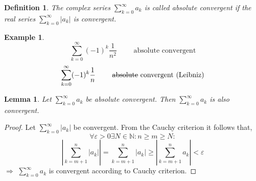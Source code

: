 \documentclass[a4paper,landscape,twocolumn]{article}
\newtheorem{defi}{Definition}
\newtheorem{ex}{Example}
\newtheorem{lemma}{Lemma}
\newcommand\abs[1]{\left|#1\right|}
\begin{document}
\begin{defi}
  The complex series $\sum_{k=0}^\infty a_k$ is called \emph{absolute convergent}
  if the real series $\sum_{k=0}^\infty \abs{a_k}$ is convergent.
\end{defi}
\begin{ex}
  \[ \sum_{k=0}^\infty (-1)^k \frac{1}{n^2} \qquad\text{ absolute convergent} \]
  \[ \sum_{k=0}^\infty (-1)^k \frac{1}{n} \qquad\text{ \sout{absolute} convergent (Leibniz)} \]
\end{ex}
%
\begin{lemma}
  Let $\sum_{k=0}^\infty a_k$ be absolute convergent.
  Then $\sum_{k=0}^\infty a_k$ is also convergent.
\end{lemma}
\begin{proof}
  Let $\sum_{k=0}^\infty \abs{a_k}$ be convergent.
  From the Cauchy criterion it follows that,
  \[ \forall \varepsilon > 0 \exists N \in \mathbb N: n \geq m \geq N: \]
  \[
    \abs{\sum_{k=m+1}^n \abs{a_k}}
    = \sum_{k=m+1}^n \abs{a_k}
    \geq \abs{\sum_{k=m+1}^n a_k}
    < \varepsilon
  \]
  $\Rightarrow$ $\sum_{k=0}^\infty a_k$ is convergent according to Cauchy criterion.
\end{proof}
%
\end{document}
